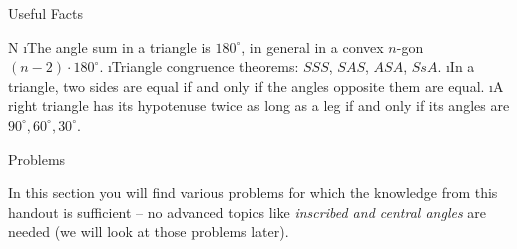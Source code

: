 \secc Useful Facts

\begitems \style N
\i The angle sum in a triangle is $180^\circ$, in general in a convex $n$-gon $(n-2) \cdot 180^\circ$.
\i Triangle congruence theorems: $SSS$, $SAS$, $ASA$, $SsA$.
\i In a triangle, two sides are equal if and only if the angles opposite them are equal.
\i A right triangle has its hypotenuse twice as long as a leg if and only if its angles are $90^\circ, 60^\circ, 30^\circ$.
\enditems

\sec Problems

In this section you will find various problems for which the knowledge from this handout is sufficient -- no advanced topics like \textit{inscribed and central angles} are needed (we will look at those problems later).


